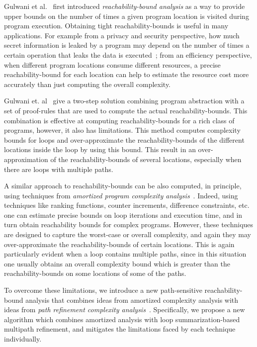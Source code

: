 
Gulwani et al.~\cite{GulwaniZ10} first introduced \emph{reachability-bound analysis} as a way to provide upper bounds on the number of times a given program location 
is visited during program execution.
Obtaining tight reachability-bounds is useful in many applications.
For example from a privacy and security perspective,
how much secret information is leaked by a program may depend on the number of times a certain operation that leaks the data
is executed~\cite{Malacaria07};
from an efficiency perspective, when different program locations consume different resources, a precise reachability-bound for each location can help to estimate the resource cost more accurately than just computing the overall complexity.

Gulwani et. al~\cite{GulwaniZ10}
give a two-step solution combining program abstraction with a set of proof-rules that are used to compute the actual reachability-bounds. This combination is effective at computing reachability-bounds for a rich class of programs, however, it also has limitations. This method 
computes complexity bounds for loops and over-approximate the reachability-bounds of the different locations inside the loop by using this bound. This result in an over-approximation of the reachability-bounds of several locations, especially when there are loops with multiple paths.

A similar approach to reachability-bounds can be also computed, in principle, using techniques from \emph{amortized program complexity analysis}~\cite{BradleyMS05,CookSZ13,Zuleger18,SinnZV14,SinnZV17,LuCT21,AliasDFG10}. Indeed, using techniques like ranking functions, counter increments, difference constraints, etc.
one can estimate 
precise bounds on loop iterations and execution time, and in turn obtain reachability bounds for complex programs. However, these techniques are designed to capture the worst-case or overall complexity, and again they may over-approximate the reachability-bounds of certain locations. This is again particularly evident when a loop contains multiple paths, since in this situation one usually obtains an overall complexity bound which is greater than the reachability-bounds on some locations of some of the paths. 

To overcome these limitations, 
we introduce a new path-sensitive reachability-bound analysis that combines ideas from amortized complexity analysis with ideas from 
\emph{path refinement complexity analysis}~\cite{GustafssonEL05,ManoliosV06,BalakrishnanSIG09,SharmaDDA11,Flores-MontoyaH14,HumenbergerJK18,CyphertBKR19,GulwaniJK09,ZulegerGSV11}.
Specifically, we propose a new algorithm which combines amortized analysis with loop summarization-based multipath refinement, and mitigates the limitations faced by each technique individually. 
%

